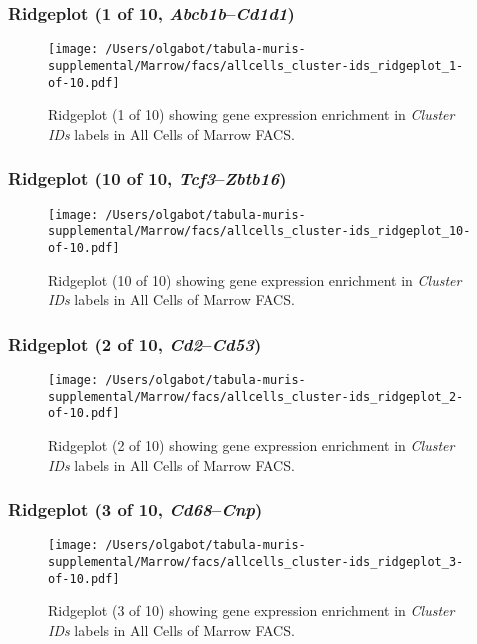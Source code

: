 \clearpage

\subsubsection{Ridgeplot (1 of 10, \emph{Abcb1b}--\emph{Cd1d1})}
\begin{figure}[h]
\centering
\texttt{[image: /Users/olgabot/tabula-muris-supplemental/Marrow/facs/allcells\_cluster-ids\_ridgeplot\_1-of-10.pdf]}

\caption{ Ridgeplot (1 of 10)  showing gene expression enrichment in \emph{Cluster IDs} labels in All Cells of Marrow FACS. }
\end{figure}


\clearpage

\subsubsection{Ridgeplot (10 of 10, \emph{Tcf3}--\emph{Zbtb16})}
\begin{figure}[h]
\centering
\texttt{[image: /Users/olgabot/tabula-muris-supplemental/Marrow/facs/allcells\_cluster-ids\_ridgeplot\_10-of-10.pdf]}

\caption{ Ridgeplot (10 of 10)  showing gene expression enrichment in \emph{Cluster IDs} labels in All Cells of Marrow FACS. }
\end{figure}


\clearpage

\subsubsection{Ridgeplot (2 of 10, \emph{Cd2}--\emph{Cd53})}
\begin{figure}[h]
\centering
\texttt{[image: /Users/olgabot/tabula-muris-supplemental/Marrow/facs/allcells\_cluster-ids\_ridgeplot\_2-of-10.pdf]}

\caption{ Ridgeplot (2 of 10)  showing gene expression enrichment in \emph{Cluster IDs} labels in All Cells of Marrow FACS. }
\end{figure}


\clearpage

\subsubsection{Ridgeplot (3 of 10, \emph{Cd68}--\emph{Cnp})}
\begin{figure}[h]
\centering
\texttt{[image: /Users/olgabot/tabula-muris-supplemental/Marrow/facs/allcells\_cluster-ids\_ridgeplot\_3-of-10.pdf]}

\caption{ Ridgeplot (3 of 10)  showing gene expression enrichment in \emph{Cluster IDs} labels in All Cells of Marrow FACS. }
\end{figure}


